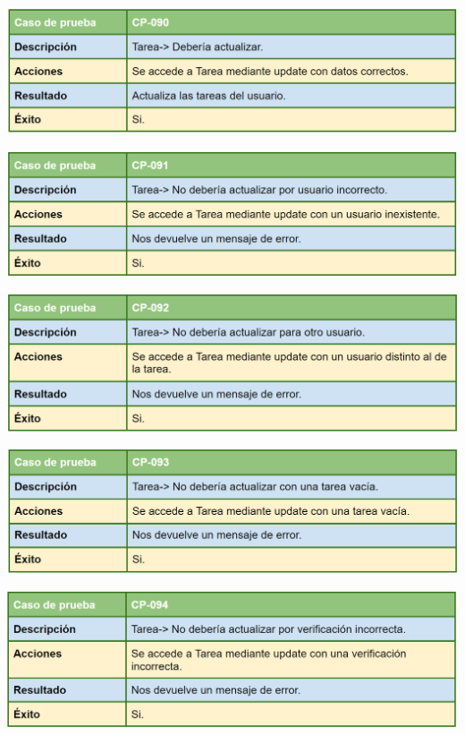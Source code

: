 \bigskip

\includegraphics[width=\textwidth]{img/cap7/cp-090.png}

\bigskip

\includegraphics[width=\textwidth]{img/cap7/cp-091.png}

\bigskip

\includegraphics[width=\textwidth]{img/cap7/cp-092.png}

\bigskip

\includegraphics[width=\textwidth]{img/cap7/cp-093.png}

\bigskip

\includegraphics[width=\textwidth]{img/cap7/cp-094.png}

